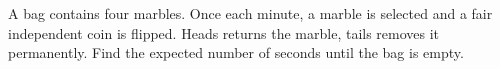 A bag contains four marbles. Once each minute, a marble is selected and a fair independent coin is flipped. Heads returns the marble, tails removes it permanently. Find the expected number of seconds until the bag is empty.
